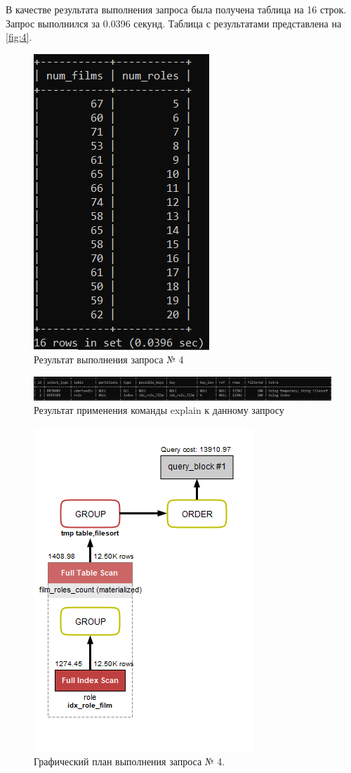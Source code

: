 \documentclass[11pt,a4paper,final]{article} %
\begin{document}
\par В качестве результата выполнения запроса была получена таблица на 16 строк. Запрос выполнился за 0.0396 секунд. Таблица с результатами представлена на \autoref{fig:4}.

\begin{figure}[H]
	\centering
	\includegraphics[width=0.25\linewidth]{4.png}
	\caption{Результат выполнения запроса № 4}
	\label{fig:4}
\end{figure}

\begin{figure}[H]
	\centering
	\includegraphics[width=1.0\linewidth]{e4.png}
	\caption{Результат применения команды explain к данному запросу}
	\label{fig:e4}
\end{figure}

\begin{figure}[H]
	\centering
	\includegraphics[width=0.4\linewidth]{ex4.png}
	\caption{Графический план выполнения запроса № 4.}
	\label{fig:ex4}
\end{figure}
\end{document}
